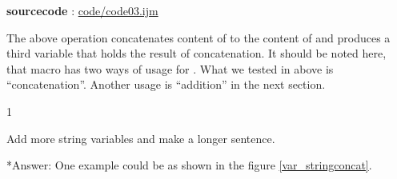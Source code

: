 \textbf{sourcecode} : \href{http://www.example.com/contents}{code/code03.ijm}

The above operation concatenates content of  to the content of  and produces a third variable  that holds the result of concatenation. It should be noted here, that macro has two ways of usage for \ilcom{+}. What we tested in above is ``concatenation''. Another usage is ``addition'' in the next section.

\begin{indentexercise}
{1}

\item Add more string variables and make a longer sentence.\\

\item **Answer: One example could be as shown in the figure \ref{var_stringconcat}.

\end{indentexercise}
